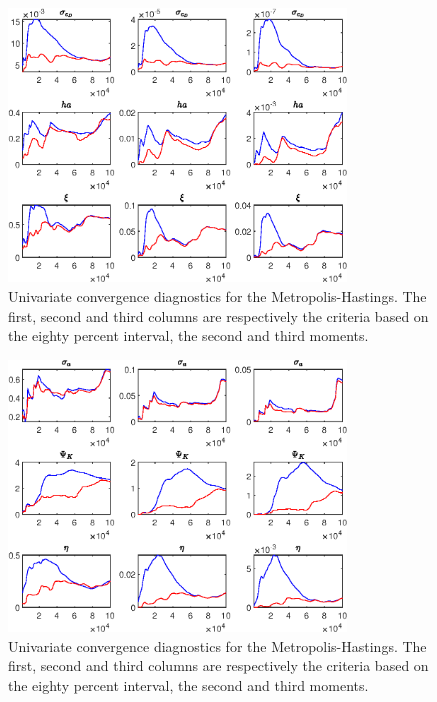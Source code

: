  
\begin{figure}[H]
\centering 
\includegraphics[width=0.80\textwidth]{BRS_growth_KPR_D/Output/BRS_growth_KPR_D_udiag1}
\caption{Univariate convergence diagnostics for the Metropolis-Hastings.
The first, second and third columns are respectively the criteria based on
the eighty percent interval, the second and third moments.}\label{Fig:UnivariateDiagnostics:1}
\end{figure}

\begin{figure}[H]
\centering 
\includegraphics[width=0.80\textwidth]{BRS_growth_KPR_D/Output/BRS_growth_KPR_D_udiag2}
\caption{Univariate convergence diagnostics for the Metropolis-Hastings.
The first, second and third columns are respectively the criteria based on
the eighty percent interval, the second and third moments.}\label{Fig:UnivariateDiagnostics:2}
\end{figure}

